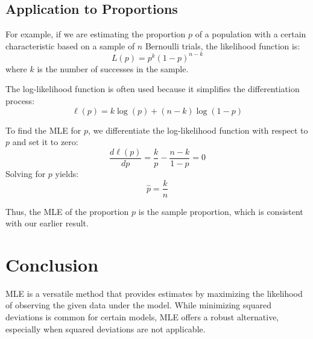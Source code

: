 \documentclass{article}
\begin{document}
\subsection{Application to Proportions}
For example, if we are estimating the proportion \(p\) of a population with a certain characteristic based on a sample of \(n\) Bernoulli trials, the likelihood function is:
\[
L(p) = p^k (1 - p)^{n - k}
\]
where \(k\) is the number of successes in the sample.

The log-likelihood function is often used because it simplifies the differentiation process:
\[
\ell(p) = k \log(p) + (n - k) \log(1 - p)
\]

To find the MLE for \(p\), we differentiate the log-likelihood function with respect to \(p\) and set it to zero:
\[
\frac{d \ell(p)}{dp} = \frac{k}{p} - \frac{n - k}{1 - p} = 0
\]
Solving for \(p\) yields:
\[
\hat{p} = \frac{k}{n}
\]

Thus, the MLE of the proportion \(p\) is the sample proportion, which is consistent with our earlier result.

\section{Conclusion}
MLE is a versatile method that provides estimates by maximizing the likelihood of observing the given data under the model. While minimizing squared deviations is common for certain models, MLE offers a robust alternative, especially when squared deviations are not applicable.
\end{document}
